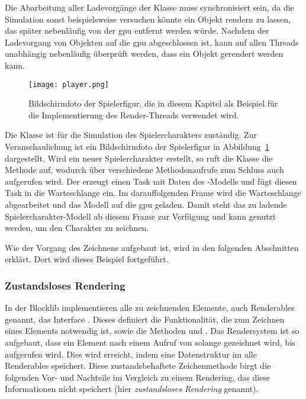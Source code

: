 Die Abarbeitung aller Ladevorgänge der Klasse \classLoader{} muss synchronisiert sein, da die Simulation sonst beispielsweise versuchen könnte ein Objekt rendern zu lassen, das später nebenläufig von der \ac{gpu} entfernt werden würde. Nachdem der Ladevorgang von Objekten auf die \ac{gpu} abgeschlossen ist, kann auf allen Threads unabhängig nebenläufig überprüft werden, dass ein Objekt gerendert werden kann.

\begin{figure}
	\centering
	\texttt{[image: player.png]}
	\caption[Bildschirmfoto der Spielerfigur in der Blocklib.]{Bildschirmfoto der Spielerfigur, die in diesem Kapitel als Beispiel für die Implementierung des Render-Threads verwendet wird.}\label{fig:player}
\end{figure}

\begin{example}
	Die Klasse \classPlayer{} ist für die Simulation des Spielercharakters zuständig. Zur Veranschaulichung ist ein Bildschirmfoto der Spielerfigur in Abbildung~\ref{fig:player} dargestellt. Wird ein neuer Spielercharakter erstellt, so ruft die Klasse \classPlayer{} die Methode  auf, wodurch über verschiedene Methodenaufrufe zum Schluss auch  aufgerufen wird. Der \classLoader{} erzeugt einen Task mit Daten des \classPlayer{}-Modells und fügt diesen Task in die Warteschlange ein. Im darauffolgenden Frame wird die Warteschlange abgearbeitet und das Modell auf die \ac{gpu} geladen. Damit steht das zu ladende Spielercharakter-Modell ab diesem Frame zur Verfügung und kann genutzt werden, um den Charakter zu zeichnen. 

	Wie der Vorgang des Zeichnens aufgebaut ist, wird in den folgenden Abschnitten erklärt. Dort wird dieses Beispiel fortgeführt.
\end{example}

\subsubsection{Zustandsloses Rendering}\label{sec:statelessRendering}
In der Blocklib implementieren alle zu zeichnenden Elemente, auch Renderables genannt, das Interface \classRenderable{}. Dieses definiert die Funktionalität, die zum Zeichnen eines Elements notwendig ist, sowie die Methoden  und . Das Rendersystem ist so aufgebaut, dass ein Element nach einem Aufruf von  solange gezeichnet wird, bis  aufgerufen wird. Dies wird erreicht, indem eine Datenstruktur im \classMasterRenderer{} alle Renderables speichert. Diese zustandsbehaftete Zeichenmethode birgt die folgenden Vor- und Nachteile im Vergleich zu einem Rendering, das diese Informationen nicht speichert (hier \emph{zustandsloses Rendering} genannt).

